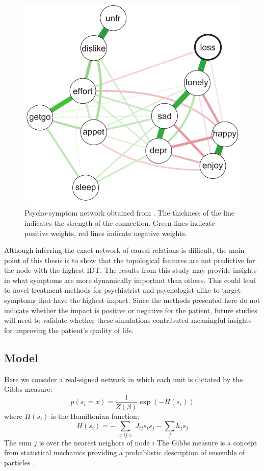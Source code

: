 \documentclass[twoside, twocolumn]{article}
\begin{document}
	\begin{figure}[!h]
		\centering \includegraphics[width = .6 \textwidth ]{figures/psycho_network}
		\caption{Psycho-symptom network obtained from \cite{Epskamp2017}. The thickness of the line indicates the strength of the connection. Green lines indicate positive weights, red lines indicate negative weights.}
		\label{fig:network}
	\end{figure}

	Although inferring the exact network of causal relations is difficult, the main point of this thesis is to show that the topological features are not predictive for the node with the highest IDT. The results from this study may provide insights in what symptoms are more dynamically important than others. This could lead to novel treatment methods for psychiatrist and psychologist alike to target symptoms that have the highest impact. Since the methods presented here do not indicate whether the impact is positive or negative for the patient, future studies will  need to validate whether these simulations contributed meaningful insights for improving the patient's quality of life.


	\subsection{Model}\label{sec:model}
	Here we consider a real-signed network in which each unit is dictated by the Gibbs measure:
	\begin{equation}
	p(s_i = x) = \frac{1}{Z(\beta)} \exp(-H(s_i))
	\end{equation}
	where $H(s_i)$ is the Hamiltonian function;
	$$H(s_i) = -\sum_{<ij>} J_{ij} s_i s_j - \sum_j h_j s_j$$
	The sum $j$ is over the nearest neighors of node $i$
	The Gibbs measure is a concept from statistical mechanics providing a probablistic description of ensemble of particles \cite{Gibbs1996}.
\end{document}
